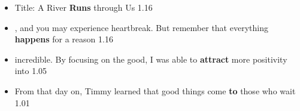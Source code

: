 \begin{itemize}[leftmargin=*,itemsep=0pt]
\item Title: A River \textbf{\textcolor{chatframe}{Runs}} through Us \hfill 1.16
\item , and you may experience heartbreak. But remember that everything \textbf{\textcolor{chatframe}{happens}} for a reason \hfill 1.16
\item incredible. By focusing on the good, I was able to \textbf{\textcolor{chatframe}{attract}} more positivity into \hfill 1.05
\item From that day on, Timmy learned that good things come \textbf{\textcolor{chatframe}{to}} those who wait \hfill 1.01
\end{itemize}
